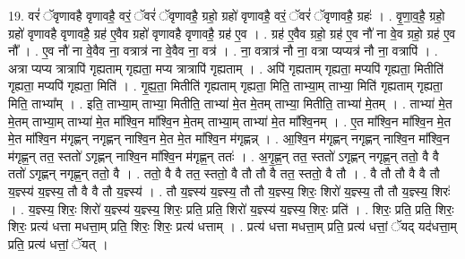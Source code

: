 \documentclass[17pt]{extarticle}
\begin{document}
19. वरं॑ ॅवृणावहै वृणावहै॒ वरं॒ ॅवरं॑ ॅवृणावहै॒ ग्रहो॒ ग्रहो॑ वृणावहै॒ वरं॒ ॅवरं॑ ॅवृणावहै॒ ग्रहः॑ । . वृ॒णा॒व॒है॒ ग्रहो॒ ग्रहो॑ वृणावहै वृणावहै॒ ग्रह॑ ए॒वैव ग्रहो॑ वृणावहै वृणावहै॒ ग्रह॑ ए॒व । . ग्रह॑ ए॒वैव ग्रहो॒ ग्रह॑ ए॒व नौ॑ ना वे॒व ग्रहो॒ ग्रह॑ ए॒व नौ᳚ । . ए॒व नौ॑ ना वे॒वैव ना॒ वत्रात्र॑ ना वे॒वैव ना॒ वत्र॑ । . ना॒ वत्रात्र॑ नौ ना॒ वत्रा प्यप्यत्र॑ नौ ना॒ वत्रापि॑ । . अत्रा प्यप्य त्रात्रापि॑ गृह्यताम् गृह्यता॒ मप्य त्रात्रापि॑ गृह्यताम् । . अपि॑ गृह्यताम् गृह्यता॒ मप्यपि॑ गृह्यता॒ मितीति॑ गृह्यता॒ मप्यपि॑ गृह्यता॒ मिति॑ । . गृ॒ह्य॒ता॒ मितीति॑ गृह्यताम् गृह्यता॒ मिति॒ ताभ्या॒म् ताभ्या॒ मिति॑ गृह्यताम् गृह्यता॒ मिति॒ ताभ्या᳚म् । . इति॒ ताभ्या॒म् ताभ्या॒ मितीति॒ ताभ्या॑ मे॒त मे॒तम् ताभ्या॒ मितीति॒ ताभ्या॑ मे॒तम् । . ताभ्या॑ मे॒त मे॒तम् ताभ्या॒म् ताभ्या॑ मे॒त मा᳚श्वि॒न मा᳚श्वि॒न मे॒तम् ताभ्या॒म् ताभ्या॑ मे॒त मा᳚श्वि॒नम् । . ए॒त मा᳚श्वि॒न मा᳚श्वि॒न मे॒त मे॒त मा᳚श्वि॒न म॑गृह्णन् नगृह्णन् नाश्वि॒न मे॒त मे॒त मा᳚श्वि॒न म॑गृह्णन्न् । . आ॒श्वि॒न म॑गृह्णन् नगृह्णन् नाश्वि॒न मा᳚श्वि॒न म॑गृह्ण॒न् तत॒ स्ततो॑ ऽगृह्णन् नाश्वि॒न मा᳚श्वि॒न म॑गृह्ण॒न् ततः॑ । . अ॒गृ॒ह्ण॒न् तत॒ स्ततो॑ ऽगृह्णन् नगृह्ण॒न् ततो॒ वै वै ततो॑ ऽगृह्णन् नगृह्ण॒न् ततो॒ वै । . ततो॒ वै वै तत॒ स्ततो॒ वै तौ तौ वै तत॒ स्ततो॒ वै तौ । . वै तौ तौ वै वै तौ य॒ज्ञ्स्य॑ य॒ज्ञ्स्य॒ तौ वै वै तौ य॒ज्ञ्स्य॑ । . तौ य॒ज्ञ्स्य॑ य॒ज्ञ्स्य॒ तौ तौ य॒ज्ञ्स्य॒ शिरः॒ शिरो॑ य॒ज्ञ्स्य॒ तौ तौ य॒ज्ञ्स्य॒ शिरः॑ । . य॒ज्ञ्स्य॒ शिरः॒ शिरो॑ य॒ज्ञ्स्य॑ य॒ज्ञ्स्य॒ शिरः॒ प्रति॒ प्रति॒ शिरो॑ य॒ज्ञ्स्य॑ य॒ज्ञ्स्य॒ शिरः॒ प्रति॑ । . शिरः॒ प्रति॒ प्रति॒ शिरः॒ शिरः॒ प्रत्य॑ धत्ता मधत्ता॒म् प्रति॒ शिरः॒ शिरः॒ प्रत्य॑ धत्ताम् । . प्रत्य॑ धत्ता मधत्ता॒म् प्रति॒ प्रत्य॑ धत्तां॒ ॅयद् यद॑धत्ता॒म् प्रति॒ प्रत्य॑ धत्तां॒ ॅयत् । \newline
\end{document}
